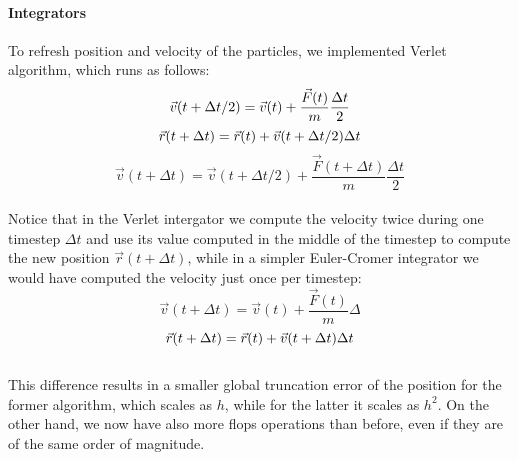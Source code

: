 \documentclass[10pt,a4paper,titlepage]{article}
\begin{document}
\paragraph{Integrators} To refresh position and velocity of the particles, we implemented Verlet algorithm, which runs as follows:
\begin{equation}
\vec v(t + \Delta t/2) = \vec v(t) + \frac{\vec F(t)}{m}\frac{\Delta t}{2}\\
\end{equation}
\begin{equation}
	\vec r(t + \Delta t) = \vec r(t) + \vec v(t + \Delta t/2)\Delta t\\
    \end{equation}
    \begin{equation}
	\vec v(t + \Delta t) = \vec v(t + \Delta t/2) + \frac{\vec F(t + \Delta t)}{m}\frac{\Delta t}{2}
\end{equation}
\\Notice that in the Verlet intergator we compute the velocity twice during one timestep $\Delta t$ and use its value computed in the middle of the timestep to compute the new position $\vec r(t+\Delta t)$, while in a simpler Euler-Cromer integrator we would have computed the velocity just once per timestep:
 \begin{equation}
	\vec v(t + \Delta t) = \vec v(t) + \frac{\vec F(t)}{m}\Delta
\end{equation}
\begin{equation}
	\vec r(t + \Delta t) = \vec r(t) + \vec v(t+\Delta t)\Delta t\\
    \end{equation}
\\This difference results in a smaller global truncation error of the position for the former algorithm, which scales as $h$, while for the latter it scales as $h^2$. On the other hand, we now have also more flops operations than before, even if they are of the same order of magnitude.
\end{document}
